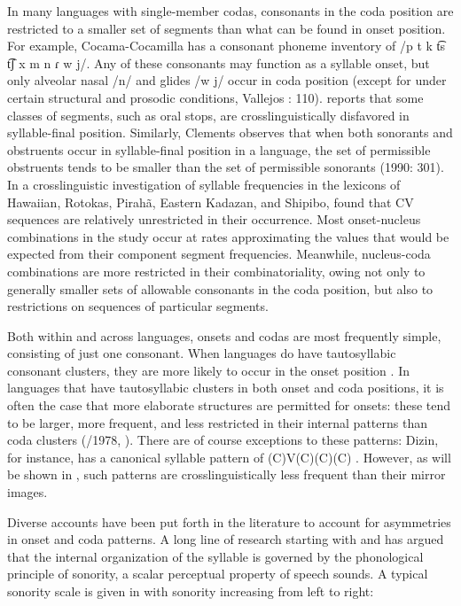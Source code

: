   In many languages with single-member codas, consonants in the coda position are restricted to a smaller set of segments than what can be found in onset position. For example, Cocama-Cocamilla has a consonant phoneme inventory of \textsf{/}p t k t͡s t͡ʃ x m n ɾ w j\textsf{/}. Any of these consonants may function as a syllable onset, but only alveolar nasal /n/ and glides /w j/ occur in coda position (except for under certain structural and prosodic conditions, Vallejos \citealt{Yopán2010}: 110). \citet{Krakow1999} reports that some classes of segments, such as oral stops, are crosslinguistically disfavored in syllable-final position. Similarly, Clements observes that when both sonorants and obstruents occur in syllable-final position in a language, the set of permissible obstruents tends to be smaller than the set of permissible sonorants (1990: 301). In a crosslinguistic investigation of syllable frequencies in the lexicons of Hawaiian, Rotokas, Pirahã, Eastern Kadazan, and Shipibo, \citet{MaddiesonPrecoda1992} found that CV sequences are relatively unrestricted in their occurrence. Most onset-nucleus combinations in the study occur at rates approximating the values that would be expected from their component segment frequencies. Meanwhile, nucleus-coda combinations are more restricted in their combinatoriality, owing not only to generally smaller sets of allowable consonants in the coda position, but also to restrictions on sequences of particular segments.

  Both within and across languages, onsets and codas are most frequently simple, consisting of just one consonant. When languages do have tautosyllabic consonant clusters, they are more likely to occur in the onset position \citep{Blevins2006}. In languages that have tautosyllabic clusters in both onset and coda positions, it is often the case that more elaborate structures are permitted for onsets: these tend to be larger, more frequent, and less restricted in their internal patterns than coda clusters (\citealt{Greenberg1965}/1978, \citealt{Blevins2006}). There are of course exceptions to these patterns: Dizin, for instance, has a canonical syllable pattern of (C)V(C)(C)(C) \citep{Beachy2005}. However, as will be shown in , such patterns are crosslinguistically less frequent than their mirror images.

  Diverse accounts have been put forth in the literature to account for asymmetries in onset and coda patterns. A long line of research starting with \citet{Sievers1881} and \citet{Jespersen1904} has argued that the internal organization of the syllable is governed by the phonological principle of sonority, a scalar perceptual property of speech sounds. A typical sonority scale is given in  with sonority increasing from left to right:


